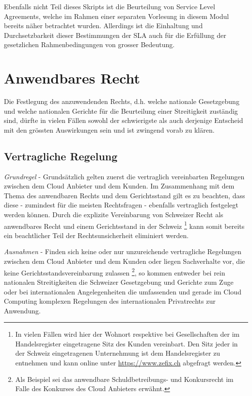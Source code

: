 \documentclass[a4paper,pointlessnumbers]{scrreprt}
\begin{document}
Ebenfalls nicht Teil dieses Skripts ist die Beurteilung von Service Level Agreements, welche im Rahmen einer separaten Vorlesung in diesem Modul bereits näher betrachtet wurden. Allerdings ist die Einhaltung und Durchsetzbarkeit dieser Bestimmungen der SLA auch für die Erfüllung der gesetzlichen Rahmenbedingungen von grosser Bedeutung.


\chapter{Anwendbares Recht} \label{anwendbaresrecht}
Die Festlegung des anzuwendenden Rechts, d.h. welche nationale Gesetzgebung und welche nationalen Gerichte für die Beurteilung einer Streitigkeit zuständig sind, dürfte in vielen Fällen sowohl der schwierigste als auch derjenige Entscheid mit den grössten Auswirkungen sein und ist zwingend vorab zu klären.

\section{Vertragliche Regelung}
\textit{Grundregel} - Grundsätzlich gelten zuerst die vertraglich vereinbarten Regelungen zwischen dem Cloud Anbieter und dem Kunden. Im Zusammenhang mit dem Thema des anwendbaren Rechts und dem Gerichtsstand gilt es zu beachten, dass diese - zumindest für die meisten Rechtsfragen - ebenfalls vertraglich festgelegt werden können. Durch die explizite Vereinbarung von Schweizer Recht als anwendbares Recht und einem Gerichtsstand in der Schweiz \footnote{In vielen Fällen wird hier der Wohnort respektive bei Gesellschaften der im Handelsregister eingetragene Sitz des Kunden vereinbart. Den Sitz jeder in der Schweiz eingetragenen Unternehmung ist dem Handelsregister zu entnehmen und kann online unter \href{https://www.zefix.ch/de/search/entity/welcome}{https://www.zefix.ch} abgefragt werden.} kann somit bereits ein beachtlicher Teil der Rechtsunsicherheit eliminiert werden.

\textit{Ausnahmen} - Finden sich keine oder nur unzureichende vertragliche Regelungen zwischen dem Cloud Anbieter und dem Kunden oder liegen Sachverhalte vor, die keine Gerichtsstandsvereinbarung zulassen \footnote{Als Beispiel sei das anwendbare Schuldbetreibungs- und Konkursrecht im Falle des Konkurses des Cloud Anbieters erwähnt.}, so kommen entweder bei rein nationalen Streitigkeiten die Schweizer Gesetzgebung und Gerichte zum Zuge oder bei internationalen Angelegenheiten die umfassenden und gerade im Cloud Computing komplexen Regelungen des internationalen Privatrechts zur Anwendung.
\end{document}
